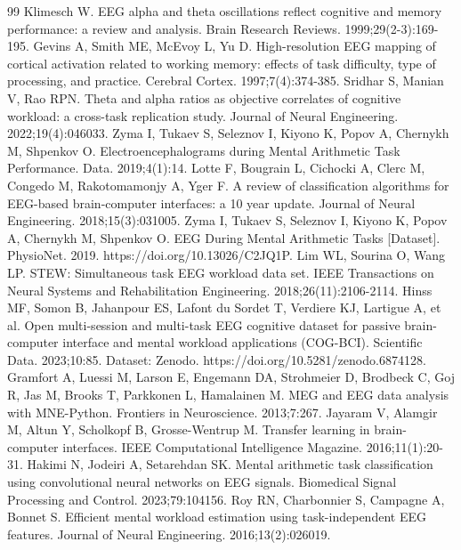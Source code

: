 \begin{thebibliography}{99}
 Klimesch W. EEG alpha and theta oscillations reflect cognitive and memory performance: a review and analysis. Brain Research Reviews. 1999;29(2-3):169-195.
 Gevins A, Smith ME, McEvoy L, Yu D. High-resolution EEG mapping of cortical activation related to working memory: effects of task difficulty, type of processing, and practice. Cerebral Cortex. 1997;7(4):374-385.
 Sridhar S, Manian V, Rao RPN. Theta and alpha ratios as objective correlates of cognitive workload: a cross-task replication study. Journal of Neural Engineering. 2022;19(4):046033.
 Zyma I, Tukaev S, Seleznov I, Kiyono K, Popov A, Chernykh M, Shpenkov O. Electroencephalograms during Mental Arithmetic Task Performance. Data. 2019;4(1):14.
 Lotte F, Bougrain L, Cichocki A, Clerc M, Congedo M, Rakotomamonjy A, Yger F. A review of classification algorithms for EEG-based brain-computer interfaces: a 10 year update. Journal of Neural Engineering. 2018;15(3):031005.
 Zyma I, Tukaev S, Seleznov I, Kiyono K, Popov A, Chernykh M, Shpenkov O. EEG During Mental Arithmetic Tasks [Dataset]. PhysioNet. 2019. https://doi.org/10.13026/C2JQ1P.
 Lim WL, Sourina O, Wang LP. STEW: Simultaneous task EEG workload data set. IEEE Transactions on Neural Systems and Rehabilitation Engineering. 2018;26(11):2106-2114.
 Hinss MF, Somon B, Jahanpour ES, Lafont du Sordet T, Verdiere KJ, Lartigue A, et al. Open multi-session and multi-task EEG cognitive dataset for passive brain-computer interface and mental workload applications (COG-BCI). Scientific Data. 2023;10:85. Dataset: Zenodo. https://doi.org/10.5281/zenodo.6874128.
 Gramfort A, Luessi M, Larson E, Engemann DA, Strohmeier D, Brodbeck C, Goj R, Jas M, Brooks T, Parkkonen L, Hamalainen M. MEG and EEG data analysis with MNE-Python. Frontiers in Neuroscience. 2013;7:267.
 Jayaram V, Alamgir M, Altun Y, Scholkopf B, Grosse-Wentrup M. Transfer learning in brain-computer interfaces. IEEE Computational Intelligence Magazine. 2016;11(1):20-31.
 Hakimi N, Jodeiri A, Setarehdan SK. Mental arithmetic task classification using convolutional neural networks on EEG signals. Biomedical Signal Processing and Control. 2023;79:104156.
 Roy RN, Charbonnier S, Campagne A, Bonnet S. Efficient mental workload estimation using task-independent EEG features. Journal of Neural Engineering. 2016;13(2):026019.

\end{thebibliography}
